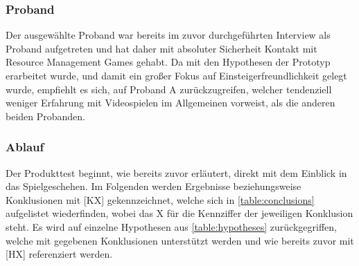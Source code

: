 \subsubsection{Proband}
Der ausgewählte Proband war bereits im zuvor durchgeführten Interview als Proband aufgetreten und hat daher mit absoluter Sicherheit Kontakt mit Resource Management Games gehabt. Da mit den Hypothesen der Prototyp erarbeitet wurde, und damit ein großer Fokus auf Einsteigerfreundlichkeit gelegt wurde, empfiehlt es sich, auf Proband A zurückzugreifen, welcher tendenziell weniger Erfahrung mit Videospielen im Allgemeinen vorweist, als die anderen beiden Probanden.

\subsubsection{Ablauf}
Der Produkttest beginnt, wie bereits zuvor erläutert, direkt mit dem Einblick in das Spielgeschehen. Im Folgenden werden Ergebnisse beziehungsweise Konklusionen mit [KX] gekennzeichnet, welche sich in \autoref{table:conclusions} aufgelistet wiederfinden, wobei das X für die Kennziffer der jeweiligen Konklusion steht. Es wird auf einzelne Hypothesen aus \autoref{table:hypotheses} zurückgegriffen, welche mit gegebenen Konklusionen unterstützt werden und wie bereits zuvor mit [HX] referenziert werden.

